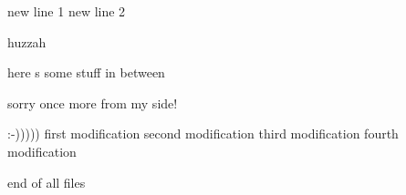 new line 1
new line 2

huzzah

here s some stuff in between

sorry once more from my side!

 :-)))))
first modification
second modification
third modification
fourth modification

end of all files

